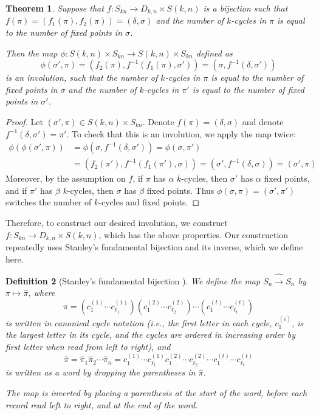 \documentclass{article}
\newtheorem{theorem}{Theorem}[section]
\numberwithin{theorem}{section}
\newtheorem{definition}[theorem]{Definition}
\theoremstyle{definition}
\begin{document}
\begin{theorem}\label{thm:involution}
    Suppose that $f\colon S_{kn} \to D_{k,n} \times S(k,n)$ is a bijection such that $f(\pi) = \left(f_1(\pi), f_2(\pi)\right) = (\delta, \sigma)$ and the number of $k$-cycles in $\pi$ is equal to the number of fixed points in $\sigma$.

    Then the map $\phi \colon S(k,n) \times S_{kn} \to S(k,n) \times S_{kn}$ defined as \[
        \phi(\sigma', \pi) = \left(f_2(\pi),f^{-1}(f_1(\pi),\sigma')\right)
        = \left(\sigma, f^{-1}(\delta, \sigma')\right)
    \]
    is an involution, such that the number of $k$-cycles in $\pi$ is equal to the number of fixed points in $\sigma$ and the number of $k$-cycles in $\pi'$ is equal to the number of fixed points in $\sigma'$.
\end{theorem}
\begin{proof}
    Let $(\sigma', \pi) \in S(k,n) \times S_{kn}$. Denote $f(\pi) = (\delta, \sigma)$ and denote $f^{-1}(\delta, \sigma') = \pi'$.
    To check that this is an involution, we apply the map twice: \begin{align*}
        \phi(\phi(\sigma', \pi))
        &= \phi\!\left(\sigma, f^{-1}(\delta, \sigma')\right)
        = \phi(\sigma,\pi') \\
        &= \left(f_2(\pi'),f^{-1}(f_1(\pi'),\sigma)\right)
        = \left(\sigma',f^{-1}(\delta,\sigma)\right)
        = \left(\sigma', \pi\right)
    \end{align*}
    Moreover, by the assumption on $f$, if $\pi$ has $\alpha$ $k$-cycles, then $\sigma'$ has $\alpha$ fixed points, and if $\pi'$ has $\beta$ $k$-cycles, then $\sigma$ has $\beta$ fixed points. Thus $\phi(\sigma, \pi) = (\sigma', \pi')$ switches the number of $k$-cycles and fixed points.
\end{proof}
Therefore, to construct our desired involution, we construct $f\colon S_{kn} \to D_{k,n} \times S(k,n)$, which has the above properties. Our construction repeatedly uses Stanley's fundamental bijection and its inverse, which we define here.
\begin{definition}[Stanley's fundamental bijection \cite{Stanley2011EC1}]
We define the map $S_n \hat\to S_n$ by $\pi \mapsto \hat\pi$, where \[
    \pi =
    (c^{(1)}_1\cdots c^{(1)}_{\ell_1})
    (c^{(2)}_1\cdots c^{(2)}_{\ell_2})
    \cdots
    (c^{(t)}_1\cdots c^{(t)}_{\ell_t})
\] is written in canonical cycle notation (i.e., the first letter in each cycle, $c^{(i)}_1$, is the largest letter in its cycle, and the cycles are ordered in increasing order by first letter when read from left to right), and \[
    \hat\pi
    = \hat\pi_1\hat\pi_2\cdots\hat\pi_n
    = c^{(1)}_1\cdots c^{(1)}_{\ell_1}
    c^{(2)}_1\cdots c^{(2)}_{\ell_{2}}
    \cdots
    c^{(t)}_1\cdots c^{(t)}_{\ell_t}
\] is written as a word by dropping the parentheses in $\hat\pi$.

The map is inverted by placing a parenthesis at the start of the word, before each record read left to right, and at the end of the word.
\end{definition}
\end{document}
